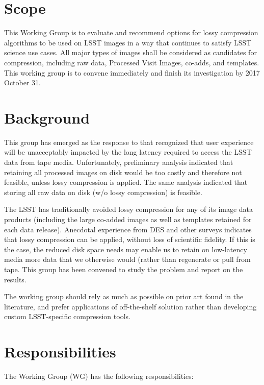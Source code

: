 
\section{Scope}

This Working Group is to evaluate and recommend options for lossy compression 
algorithms to be used on LSST images in a way that continues to satisfy LSST 
science use cases. All major types of images shall be considered as candidates 
for compression, including raw data, Processed Visit Images, co-adds, and 
templates.  This working group is to convene immediately and finish its 
investigation by 2017 October 31.

\section{Background}

This group has emerged as the response to  that recognized that user 
experience will be unacceptably impacted by the long latency required to 
access the LSST data from tape media. Unfortunately, preliminary analysis
indicated that retaining all processed images on disk would be too costly 
and therefore not feasible, unless lossy compression is applied. The same
analysis indicated that storing all raw data on disk (w/o lossy compression)
is feasible.

The LSST has traditionally avoided lossy compression for any of its image 
data products (including the large co-added images as well as templates 
retained for each data release). Anecdotal experience from DES and other 
surveys indicates that lossy compression can be applied, without loss of 
scientific fidelity. If this is the case, the reduced disk space needs may 
enable us to retain on low-latency media more data that we otherwise would 
(rather than regenerate or pull from tape. This group has been convened to 
study the problem and report on the results.

The working group should rely as much as possible on prior art found in the
literature, and prefer applications of off-the-shelf solution rather than 
developing custom LSST-specific compression tools.

\section{Responsibilities}

The Working Group (WG) has the following responsibilities:

